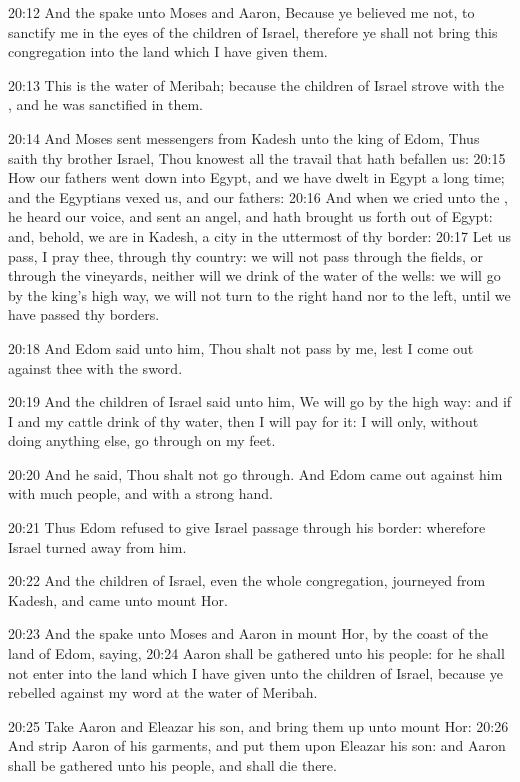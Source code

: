 20:12 And the \LORD spake unto Moses and Aaron, Because ye believed me not, to sanctify me in the eyes of the children of Israel, therefore ye shall not bring this congregation into the land which I have given them.

20:13 This is the water of Meribah; because the children of Israel strove with the \LORD, and he was sanctified in them.

20:14 And Moses sent messengers from Kadesh unto the king of Edom, Thus saith thy brother Israel, Thou knowest all the travail that hath befallen us: 20:15 How our fathers went down into Egypt, and we have dwelt in Egypt a long time; and the Egyptians vexed us, and our fathers: 20:16 And when we cried unto the \LORD, he heard our voice, and sent an angel, and hath brought us forth out of Egypt: and, behold, we are in Kadesh, a city in the uttermost of thy border: 20:17 Let us pass, I pray thee, through thy country: we will not pass through the fields, or through the vineyards, neither will we drink of the water of the wells: we will go by the king's high way, we will not turn to the right hand nor to the left, until we have passed thy borders.

20:18 And Edom said unto him, Thou shalt not pass by me, lest I come out against thee with the sword.

20:19 And the children of Israel said unto him, We will go by the high way: and if I and my cattle drink of thy water, then I will pay for it: I will only, without doing anything else, go through on my feet.

20:20 And he said, Thou shalt not go through. And Edom came out against him with much people, and with a strong hand.

20:21 Thus Edom refused to give Israel passage through his border: wherefore Israel turned away from him.

20:22 And the children of Israel, even the whole congregation, journeyed from Kadesh, and came unto mount Hor.

20:23 And the \LORD spake unto Moses and Aaron in mount Hor, by the coast of the land of Edom, saying, 20:24 Aaron shall be gathered unto his people: for he shall not enter into the land which I have given unto the children of Israel, because ye rebelled against my word at the water of Meribah.

20:25 Take Aaron and Eleazar his son, and bring them up unto mount Hor: 20:26 And strip Aaron of his garments, and put them upon Eleazar his son: and Aaron shall be gathered unto his people, and shall die there.

